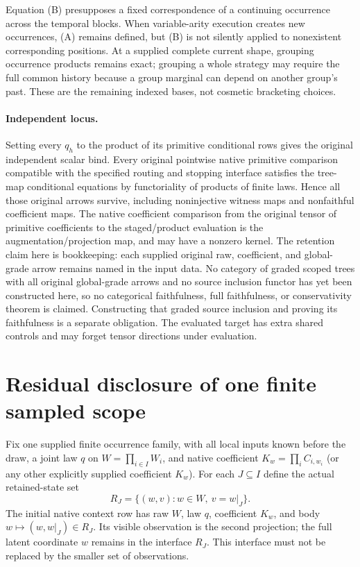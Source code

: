 \documentclass[11pt]{article}
\begin{document}
Equation (B) presupposes a fixed correspondence of a continuing occurrence across the temporal blocks. When variable-arity execution creates new occurrences, (A) remains defined, but (B) is not silently applied to nonexistent corresponding positions. At a supplied complete current shape, grouping occurrence products remains exact; grouping a whole strategy may require the full common history because a group marginal can depend on another group's past. These are the remaining indexed bases, not cosmetic bracketing choices.

\paragraph{Independent locus.} Setting every $q_h$ to the product of its primitive conditional rows gives the original independent scalar bind. Every original pointwise native primitive comparison compatible with the specified routing and stopping interface satisfies the tree-map conditional equations by functoriality of products of finite laws. Hence all those original arrows survive, including noninjective witness maps and nonfaithful coefficient maps. The native coefficient comparison from the original tensor of primitive coefficients to the staged/product evaluation is the augmentation/projection map, and may have a nonzero kernel. The retention claim here is bookkeeping: each supplied original raw, coefficient, and global-grade arrow remains named in the input data. No category of graded scoped trees with all original global-grade arrows and no source inclusion functor has yet been constructed here, so no categorical faithfulness, full faithfulness, or conservativity theorem is claimed. Constructing that graded source inclusion and proving its faithfulness is a separate obligation. The evaluated target has extra shared controls and may forget tensor directions under evaluation.

\section{Residual disclosure of one finite sampled scope}
Fix one supplied finite occurrence family, with all local inputs known before the draw, a joint law $q$ on $W=\prod_{i\in I}W_i$, and native coefficient $K_w=\prod_i C_{i,w_i}$ (or any other explicitly supplied coefficient $K_w$). For each $J\subseteq I$ define the actual retained-state set
\[
 R_J=\{(w,v):w\in W,\ v=w|_J\}.
\]
The initial native context row has raw $W$, law $q$, coefficient $K_w$, and body $w\mapsto(w,w|_J)\in R_J$. Its visible observation is the second projection; the full latent coordinate $w$ remains in the interface $R_J$. This interface must not be replaced by the smaller set of observations.
\end{document}

